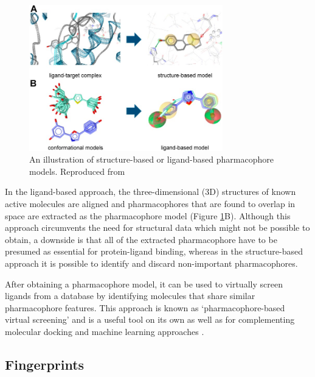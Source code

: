 \begin{figure}[htbp!] 
    \centering    
    \includegraphics[width=0.75\textwidth]{Chapters/Background/Figs/pharmacophore_models.png}
    \caption{An illustration of structure-based or ligand-based pharmacophore models. Reproduced from \cite{Kaserer2015PharmacophoreReview}}
    \label{fig:pharmacophore_models}
\end{figure}

In the ligand-based approach, the three-dimensional (3D) structures of known active molecules are aligned and pharmacophores that are found to overlap in space are extracted as the pharmacophore model (Figure \ref{fig:pharmacophore_models}B). Although this approach circumvents the need for structural data which might not be possible to obtain, a downside is that all of the extracted pharmacophore have to be presumed as essential for protein-ligand binding, whereas in the structure-based approach it is possible to identify and discard non-important pharmacophores.

After obtaining a pharmacophore model, it can be used to virtually screen ligands from a database by identifying molecules that share similar pharmacophore features. This approach is known as `pharmacophore-based virtual screening' and is a useful tool on its own as well as for complementing molecular docking and machine learning approaches \cite{Dixon2006pharmacophore, Temml2014pharmacophore, Pradeepkiran2019pharmacophore, Pal2019pharmacophore}.


\subsection{Fingerprints} \label{subsec:fingerprints}

